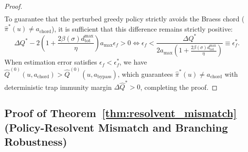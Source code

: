 \documentclass[11pt,a4paper]{article}
\begin{document}
\begin{proof}
\begin{align}
\end{align}
To guarantee that the perturbed greedy policy strictly avoids the Braess chord ($\hat{\pi}^*(u) \ne a_{\text{chord}}$), it is sufficient that this difference remains strictly positive:
\begin{equation}
\Delta Q^* - 2 \left( 1 + \frac{2 \beta(\sigma) d_{\text{tot}}^{\max}}{\eta} \right) a_{\max} \epsilon_f > 0 \iff \epsilon_f < \frac{\Delta Q^*}{2 a_{\max} \left( 1 + \frac{2 \beta(\sigma) d_{\text{tot}}^{\max}}{\eta} \right)} \equiv \epsilon_f^*.
\end{equation}
When estimation error satisfies $\epsilon_f < \epsilon_f^*$, we have $\hat{Q}^{(0)}(u, a_{\text{chord}}) > \hat{Q}^{(0)}(u, a_{\text{bypass}})$, which guarantees $\hat{\pi}^*(u) \ne a_{\text{chord}}$ with deterministic trap immunity margin $\Delta \hat{Q}^* > 0$, completing the proof.
\end{proof}

\subsection{Proof of Theorem~\ref{thm:resolvent_mismatch} (Policy-Resolvent Mismatch and Branching Robustness)}
\label{subsec:proof_mismatch}
\end{document}
